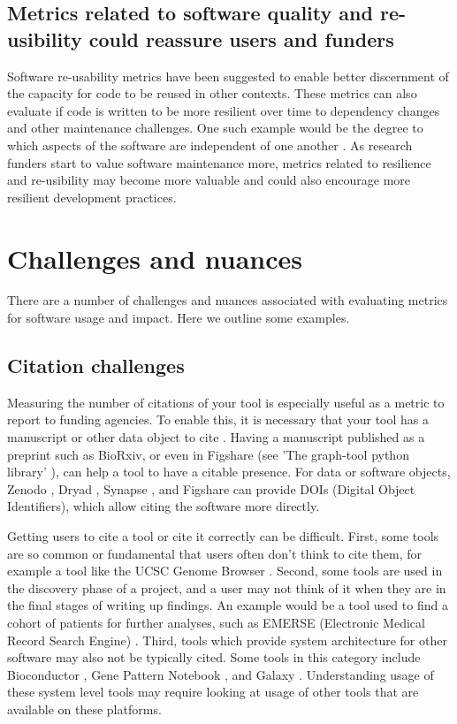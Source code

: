 \documentclass{article}
\begin{document}
\subsection{Metrics related to software quality and re-usibility could reassure users and funders}

 Software re-usability metrics have been suggested to enable better discernment of the capacity for code to be reused in other contexts. These metrics can also evaluate if code is written to be more resilient over time to dependency changes and other maintenance challenges. One such example would be the degree to which aspects of the software are independent of one another \cite{mehboob_reusability_2021}. As research funders start to value software maintenance more, metrics related to resilience and re-usibility may become more valuable and could also encourage more resilient development practices. 


\section{Challenges and nuances}

There are a number of challenges and nuances associated with evaluating metrics for software usage and impact. Here we outline some examples.

\subsection{Citation challenges}
Measuring the number of citations of your tool is especially useful as a metric to report to funding agencies. To enable this, it is necessary that your tool has a manuscript or other data object to cite \cite{chue_hong_software_2019}. Having a manuscript published as a preprint such as BioRxiv, or even in Figshare (see 'The graph-tool python library' \cite{peixoto_graph-tool_2017}), can help a tool to have a citable presence. For data or software objects, Zenodo \cite{zenodo}, Dryad \cite{datadryad}, Synapse \cite{synapse}, and Figshare \cite{figshare} can provide DOIs (Digital Object Identifiers), which allow citing the software more directly. 

Getting users to cite a tool or cite it correctly can be difficult. First, some tools are so common or fundamental that users often don't think to cite them, for example a tool like the UCSC Genome Browser \cite{ucsc, kent_human_2002}. Second, some tools are used in the discovery phase of a project, and a user may not think of it when they are in the final stages of writing up findings. An example would be a tool used to find a cohort of patients for further analyses, such as EMERSE (Electronic Medical Record Search Engine) \cite{hanauer_supporting_2015}. Third, tools which provide system architecture for other software may also not be typically cited. Some tools in this category include Bioconductor \cite{bioconductor}, Gene Pattern Notebook \cite{reich_genepattern_2017}, and Galaxy \cite{the_galaxy_community_galaxy_2022}. Understanding usage of these system level tools may require looking at usage of other tools that are available on these platforms.   
\end{document}
